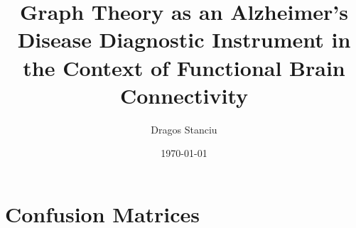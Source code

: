 \documentclass[12pt,oneside,abbrevs,dtc,mscres,neuro,notimes,logo]{styles/infthesis}
\title{Graph Theory as an Alzheimer's Disease Diagnostic Instrument in the Context of Functional Brain Connectivity}
\author{Dragos Stanciu}
\date{\today}
\begin{document}
  \begin{preliminary}
    \maketitle
    
    \standarddeclaration
    
    \tableofcontents
    \listoffigures
    \listoftables
  \end{preliminary}

  \acresetall
  
  
  
  
  
  

  \appendix
  
  
  
  \chapter{Confusion Matrices}
  \label{appendix:confusionmatrices}
  
  

  \printbibliography
\end{document}
